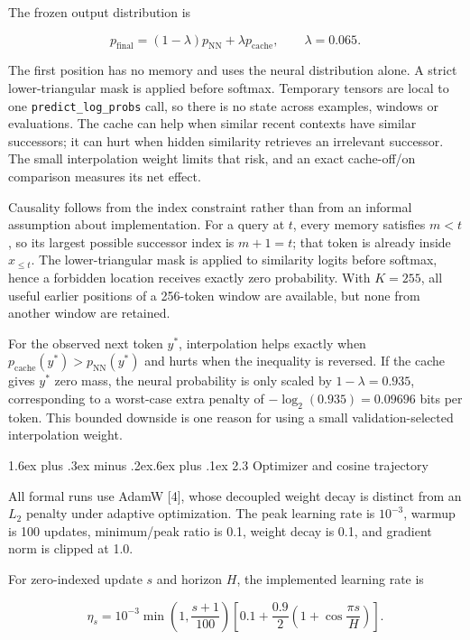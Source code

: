 \documentclass[11pt]{article}
\makeatletter
\renewcommand\subsection{\@startsection{subsection}{2}{0pt}%
  {1.6ex plus .3ex minus .2ex}{.6ex plus .1ex}%
  {\normalfont\normalsize\bfseries}}
\makeatother
\begin{document}
The frozen output distribution is

\[
p_{\mathrm{final}}=(1-\lambda)p_{\mathrm{NN}}
+\lambda p_{\mathrm{cache}},\qquad \lambda=0.065.
\]

The first position has no memory and uses the neural distribution alone.
A strict lower-triangular mask is applied before softmax. Temporary
tensors are local to one \texttt{predict\_log\_probs} call, so there is
no state across examples, windows or evaluations. The cache can help
when similar recent contexts have similar successors; it can hurt when
hidden similarity retrieves an irrelevant successor. The small
interpolation weight limits that risk, and an exact cache-off/on
comparison measures its net effect.

Causality follows from the index constraint rather than from an informal
assumption about implementation. For a query at \(t\), every memory
satisfies \(m<t\), so its largest possible successor index is \(m+1=t\);
that token is already inside \(x_{\leq t}\). The lower-triangular mask is
applied to similarity logits before softmax, hence a forbidden location
receives exactly zero probability. With \(K=255\), all useful earlier
positions of a 256-token window are available, but none from another
window are retained.

For the observed next token \(y^*\), interpolation helps exactly when
\(p_{\mathrm{cache}}(y^*)>p_{\mathrm{NN}}(y^*)\) and hurts when the
inequality is reversed. If the cache gives \(y^*\) zero mass, the neural
probability is only scaled by \(1-\lambda=0.935\), corresponding to a
worst-case extra penalty of \(-\log_2(0.935)=0.09696\) bits per token.
This bounded downside is one reason for using a small
validation-selected interpolation weight.

\subsection{2.3 Optimizer and cosine
trajectory}\label{23-optimizer-and-cosine-trajectory}

All formal runs use AdamW {[}4{]}, whose decoupled weight decay is
distinct from an \(L_2\) penalty under adaptive optimization. The peak
learning rate is \(10^{-3}\), warmup is 100 updates, minimum/peak ratio
is 0.1, weight decay is 0.1, and gradient norm is clipped at 1.0.

For zero-indexed update \(s\) and horizon \(H\), the implemented learning
rate is

\[
\eta_s=10^{-3}\min\!\left(1,\frac{s+1}{100}\right)
\left[0.1+\frac{0.9}{2}\left(1+\cos\frac{\pi s}{H}\right)\right].
\]
\end{document}
